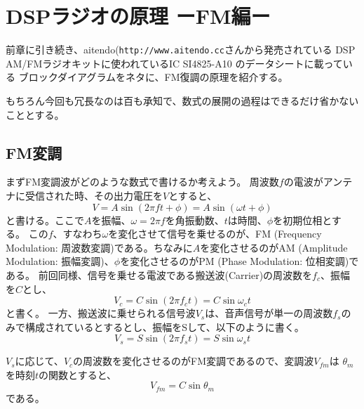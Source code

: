 \chapter*{DSPラジオの原理 ーFM編ー}
前章に引き続き、aitendo(\texttt{http://www.aitendo.cc}さんから発売されている
DSP AM/FMラジオキットに使われているIC SI4825-A10 のデータシートに載っている
ブロックダイアグラムをネタに、FM復調の原理を紹介する。

もちろん今回も冗長なのは百も承知で、数式の展開の過程はできるだけ省かないこととする。

\section*{FM変調}
まずFM変調波がどのような数式で書けるか考えよう。
周波数$f$の電波がアンテナに受信された時、その出力電圧を$V$とすると、
\begin{equation}
V = A\sin(2 \pi f t + \phi) = A\sin(\omega t + \phi)
\end{equation}
と書ける。ここで$A$を振幅、$\omega=2\pi f$を角振動数、$t$は時間、$\phi$を初期位相とす
る。
この$f$、すなわち$\omega$を変化させて信号を乗せるのが、FM (Frequency Modulation: 周波数変調)である。ちなみに$A$を変化させるのがAM (Amplitude Modulation: 振幅変調)、$\phi$を変化させるのがPM (Phase Modulation: 位相変調)である。
前回同様、信号を乗せる電波である搬送波(Carrier)の周波数を$f_c$、振幅を$C$とし、
\begin{equation}
V_c = C\sin(2 \pi f_c t) = C\sin\omega_c t \label{eq:FM_car}
\end{equation}
と書く。
一方、搬送波に乗せられる信号波$V_s$は、音声信号が単一の周波数$f_s$のみで構成されているとするとし、振幅をSして、以下のように書く。
\begin{equation}
V_s = S\sin(2 \pi f_s t) = S\sin\omega_s t \label{eq:FM_sig}
\end{equation}

$V_s$に応じて、$V_c$の周波数を変化させるのがFM変調であるので、変調波$V_{fm}$は
$\theta_m$を時刻$t$の関数とすると、
\begin{equation}
V_{fm} = C\sin\theta_m \label{eq:FM_mod}
\end{equation}
である。

